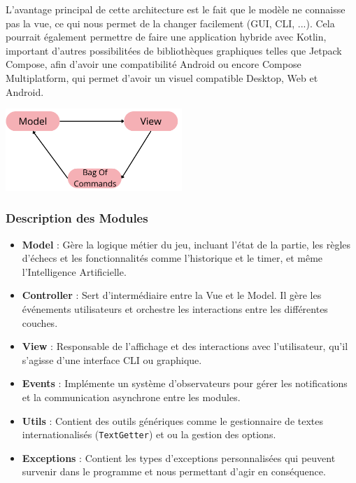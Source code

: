 \documentclass{article}
\begin{document}
L'avantage principal de cette architecture est le fait que le modèle ne connaisse pas la vue, ce qui nous permet de la changer facilement (GUI, CLI, ...).
Cela pourrait également permettre de faire une application hybride avec Kotlin, important d'autres possibilitées de bibliothèques graphiques telles que Jetpack Compose,
afin d'avoir une compatibilité Android ou encore Compose Multiplatform, qui permet d'avoir un visuel compatible Desktop, Web et Android.

\begin{center}
    \includegraphics[width=0.5\textwidth]{MVC}
\end{center}

\subsubsection{Description des Modules}

\begin{itemize}
    \item \textbf{Model} : Gère la logique métier du jeu, incluant l'état de la partie, les règles d'échecs et les fonctionnalités comme l'historique et le timer, et même l'Intelligence Artificielle.
    \item \textbf{Controller} : Sert d'intermédiaire entre la Vue et le Model. Il gère les événements utilisateurs et orchestre les interactions entre les différentes couches.
    \item \textbf{View} : Responsable de l'affichage et des interactions avec l'utilisateur, qu'il s'agisse d'une interface CLI ou graphique.
    \item \textbf{Events} : Implémente un système d'observateurs pour gérer les notifications et la communication asynchrone entre les modules.
    \item \textbf{Utils} : Contient des outils génériques comme le gestionnaire de textes internationalisés (\texttt{TextGetter}) et ou la gestion des options.
    \item \textbf{Exceptions} : Contient les types d'exceptions personnalisées qui peuvent survenir dans le programme et nous permettant d'agir en conséquence.
\end{itemize}
\end{document}
